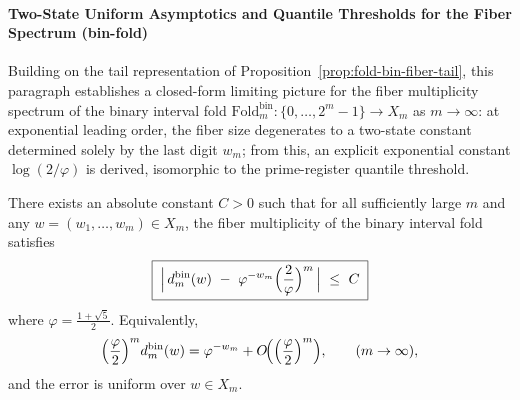 \paragraph{Two-State Uniform Asymptotics and Quantile Thresholds for the Fiber Spectrum (bin-fold)}
Building on the tail representation of Proposition~\ref{prop:fold-bin-fiber-tail}, this paragraph establishes a closed-form limiting picture for the fiber multiplicity spectrum of the binary interval fold
\(\mathrm{Fold}^{\mathrm{bin}}_m:\{0,\dots,2^m-1\}\to X_m\)
as \(m\to\infty\): at exponential leading order, the fiber size degenerates to a two-state constant determined solely by the last digit \(w_m\); from this, an explicit exponential constant \(\log(2/\varphi)\) is derived, isomorphic to the prime-register quantile threshold.

\begin{theorem}\label{thm:fold-bin-two-state-asymptotic}
There exists an absolute constant \(C>0\) such that for all sufficiently large \(m\) and any \(w=(w_1,\dots,w_m)\in X_m\), the fiber multiplicity of the binary interval fold satisfies
\begin{equation}\label{eq:fold-bin-two-state-asymptotic}
\boxed{\;
\Bigl|\,d^{\mathrm{bin}}_m(w)\ -\ \varphi^{-w_m}\Bigl(\frac{2}{\varphi}\Bigr)^m\,\Bigr|\ \le\ C\;}
\end{equation}
where \(\varphi=\frac{1+\sqrt5}{2}\).
Equivalently,
\[
\Bigl(\frac{\varphi}{2}\Bigr)^m d^{\mathrm{bin}}_m(w)
=\varphi^{-w_m}+O\!\Bigl(\Bigl(\frac{\varphi}{2}\Bigr)^m\Bigr),
\qquad (m\to\infty),
\]
and the error is uniform over \(w\in X_m\).
\end{theorem}

